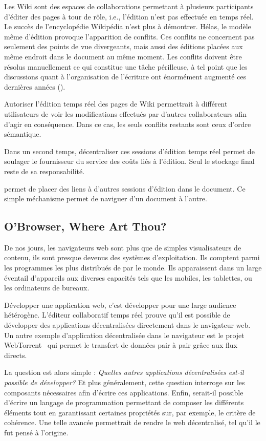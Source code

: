 Les Wiki sont des espaces de collaborations permettant à plusieurs participants
d'éditer des pages à tour de rôle, i.e., l'édition n'est pas effectuée en temps
réel. Le succès de l'encyclopédie Wikipédia n'est plus à démontrer. Hélas, le
modèle même d'édition provoque l'apparition de conflits. Ces conflits ne
concernent pas seulement des points de vue divergeants, mais aussi des éditions
placées aux même endroit dans le document au même moment. Les conflits doivent
être résolus manuellement ce qui constitue une tâche périlleuse, à tel point que
les discussions quant à l'organisation de l'écriture ont énormément augmenté ces
dernières années (\REF). 

Autoriser l'édition temps réel des pages de Wiki permettrait à différent
utilisateurs de voir les modifications effectués par d'autres collaborateurs
afin d'agir en conséquence. Dans ce cas, les seuls conflits restants sont ceux
d'ordre sémantique. 

Dans un second temps, décentraliser ces sessions d'édition temps réel permet de
soulager le fournisseur du service des coûts liés à l'édition. Seul le stockage
final reste de sa responsabilité.  

\CRATE permet de placer des liens à d'autres sessions d'édition dans le
document. Ce simple méchanisme permet de naviguer d'un document à
l'autre. 


\subsection{O'Browser, Where Art Thou?}

De nos jours, les navigateurs web sont plus que de simples visualisateurs de
contenu, ils sont presque devenus des systèmes d'exploitation. Ils comptent
parmi les programmes les plus distribués de par le monde. Ils apparaissent dans
un large éventail d'appareils aux diverses capacités tels que les mobiles, les
tablettes, ou les ordinateurs de bureaux.

Développer une application web, c'est développer pour une large audience
hétérogène.  L'éditeur collaboratif temps réel \CRATE prouve qu'il est possible
de développer des applications décentralisées directement dans le navigateur
web. Un autre exemple d'application décentralisée dans le navigateur est le
projet WebTorrent~\cite{webtorrent} qui permet le transfert de données pair à
pair grâce aux flux directs.

La question est alors simple : \emph{Quelles autres applications décentralisées
  est-il possible de développer?} Et plus généralement, cette question interroge
sur les composants nécessaires afin d'écrire ces applications. Enfin, serait-il
possible d'écrire un langage de programmation permettant de composer les
différents éléments tout en garantissant certaines propriétés sur, par exemple,
le critère de cohérence. Une telle avancée permettrait de rendre le web
décentralisé, tel qu'il le fut pensé à l'origine.

